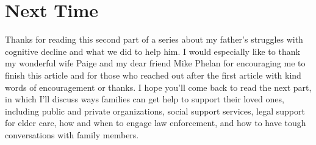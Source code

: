 \documentclass{article}
\begin{document}
\section*{Next Time}

Thanks for reading this second part of a series about my father’s struggles with cognitive decline and what we did to help him. I would especially like to thank my wonderful wife Paige and my dear friend Mike Phelan for encouraging me to finish this article and for those who reached out after the first article with kind words of encouragement or thanks. I hope you’ll come back to read the next part, in which I'll discuss ways families can get help to support their loved ones, including public and private organizations, social support services, legal support for elder care, how and when to engage law enforcement, and how to have tough conversations with family members.





\end{document}
